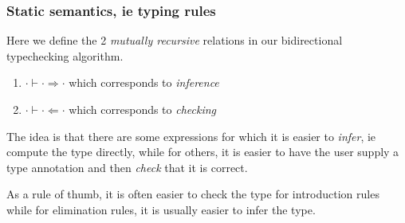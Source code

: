 \documentclass{article}
\begin{document}
\subsubsection{Static semantics, ie typing rules}
Here we define the 2 \textit{mutually recursive} relations in our bidirectional
typechecking algorithm.
\begin{enumerate}
\item$\cdot \vdash \cdot \Rightarrow \cdot $ which corresponds to \textit{inference}
\item$\cdot \vdash \cdot \Leftarrow \cdot$ which corresponds to \textit{checking}
\end{enumerate}

The idea is that there are some expressions for which it is easier to
\textit{infer},
ie compute the type directly, while for others, it is easier to have the user
supply a type annotation and then \textit{check} that it is correct.

As a rule of thumb, it is often easier to check the type for
introduction rules while for elimination rules, it is usually easier to infer
the type.
\end{document}
